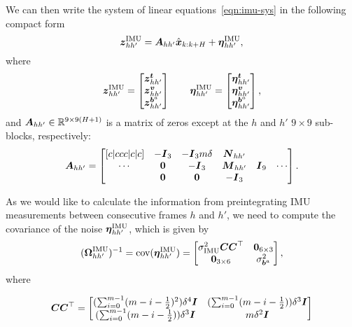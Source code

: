 We can then write the system of linear equations~\eqref{eqn:imu-sys} in the following compact form
\begin{equation}
\boldsymbol z_{hh'}^\text{IMU} = \boldsymbol A_{hh'}\hat{\boldsymbol x}_{k:k+H} + \boldsymbol\eta^\text{IMU}_{hh'},
\end{equation}
where
\begin{equation*}
\boldsymbol z_{hh'}^\text{IMU}=\begin{bmatrix}\boldsymbol z_{hh'}^{\boldsymbol t}\\\boldsymbol z_{hh'}^{\boldsymbol v}\\\boldsymbol z_{hh'}^{\boldsymbol b^a}\end{bmatrix}
\qquad
\boldsymbol\eta^\text{IMU}_{hh'}=\begin{bmatrix}\boldsymbol\eta^{\boldsymbol t}_{hh'}\\\boldsymbol\eta^{\boldsymbol v}_{hh'}\\\boldsymbol\eta^{\boldsymbol b^a}_{hh'}\end{bmatrix},
\end{equation*}
and $\boldsymbol A_{hh'}\in\mathbb{R}^{9\times9(H+1)}$ is a matrix of zeros except at the $h$ and $h'$ $9\times9$ sub-blocks, respectively:
\begin{equation}
\boldsymbol A_{hh'} =
\begin{bmatrix}[c|ccc|c|c]
       & -\boldsymbol I_3  & -\boldsymbol I_3m\delta & \boldsymbol N_{hh'} &      &       \\
\cdots &  \boldsymbol 0 & -\boldsymbol I_3            & \boldsymbol M_{hh'} & \boldsymbol I_9 & \cdots\\
       &  \boldsymbol 0 & \boldsymbol 0            & -\boldsymbol I_3    &      &
\end{bmatrix}.
\end{equation}

As we would like to calculate the information from preintegrating IMU measurements between consecutive frames $h$ and $h'$, we need to compute the covariance of the noise $\boldsymbol\eta^\text{IMU}_{hh'}$, which is given by
\begin{equation}
({\boldsymbol \Omega}^\text{IMU}_{hh'})^{-1} = \text{cov}(\boldsymbol\eta^\text{IMU}_{hh'}) =
\begin{bmatrix}
\sigma^2_\text{IMU}\boldsymbol C\boldsymbol C^\top & \boldsymbol 0_{6\times3} \\
\boldsymbol 0_{3\times6} & \sigma^2_{\boldsymbol b^a}
\end{bmatrix},
\end{equation}
where
\begin{small}
\begin{equation*}
\boldsymbol C\boldsymbol C^\top =
\begin{bmatrix}
(\sum_{i=0}^{m-1} (m - i - \frac{1}{2})^2)\delta^4\boldsymbol I   & (\sum_{i=0}^{m-1} (m - i - \frac{1}{2}))\delta^3\boldsymbol I \\
(\sum_{i=0}^{m-1} (m - i - \frac{1}{2}))\delta^3\boldsymbol I     & m\delta^2\boldsymbol I
\end{bmatrix}
\end{equation*}
\end{small}

